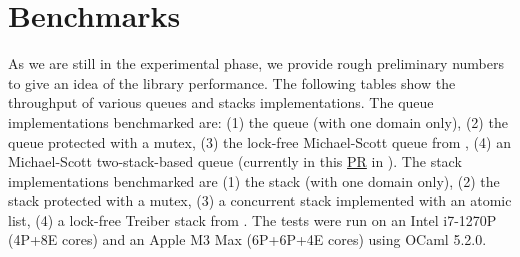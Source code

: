 \documentclass[a4paper, 11pt]{article}
\begin{document}
% 
\section{Benchmarks}\label{sec:benchmarks}



As we are still in the experimental phase, we provide rough preliminary numbers to give an idea of the library performance. The following tables show the throughput of various queues and stacks implementations. The queue implementations benchmarked are:
(1) the \Stdlib queue (with one domain only),
(2) the \Stdlib queue protected with a mutex,
(3) the lock-free Michael-Scott queue from \Saturn,
(4) an Michael-Scott two-stack-based queue (currently in this \href{https://github.com/ocaml-multicore/saturn/pull/112}{PR} in \Saturn).
The stack implementations benchmarked are
(1) the \Stdlib stack (with one domain only),
(2) the \Stdlib stack protected with a mutex,
(3) a concurrent stack implemented with an atomic list,
(4) a lock-free Treiber stack from \Saturn.
The tests were run on an Intel i7-1270P (4P+8E cores) and an Apple M3 Max (6P+6P+4E cores) using OCaml 5.2.0.
\end{document}
